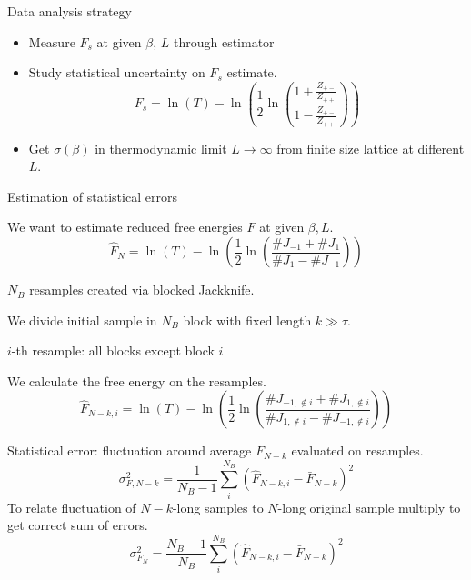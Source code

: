 \documentclass[12pt,handout]{beamer}
\begin{document}
\begin{frame}{Data analysis strategy}
\begin{center}
\begin{itemize}
\item Measure $F_s$ at given $\beta$, $L$ through estimator
\item Study statistical uncertainty on $F_s$ estimate.
\[
	F_s = \ln \left( T \right) - \ln \left( \frac{1}{2} \ln \left( \frac{1 + \frac{Z_{+-}}{Z_{++}}}{1 - \frac{Z_{+-}}{Z_{++}}} \right) \right)
\]
\vspace{10pt}
\item Get $\sigma\left(\beta\right)$ in thermodynamic limit $L\rightarrow \infty$ from finite size lattice at different $L$.
\end{itemize}
\vspace{10pt}
\end{center}
\end{frame}

\begin{frame}{Estimation of statistical errors}
\begin{center}
We want to estimate reduced free energies $F$ at given $\beta, L$.
\[
	\hat{F}_N = \ln \left( T \right) - \ln \left( \frac{1}{2} \ln \left( \frac{\# J_{-1} + \# J_1}{\# J_1 - \# J_{-1}} \right) \right)
\]

$N_B$ resamples created via blocked Jackknife.

We divide initial sample in $N_B$ block with fixed length $k\gg \tau$.

$i$-th resample: all blocks except block $i$

We calculate the free energy on the resamples.
\[
	\hat{F}_{N-k, i}  = \ln \left( T \right) - \ln \left( \frac{1}{2} \ln \left( \frac{\# J_{-1, \not\in i} + \# J_{1, \not\in i}}{\# J_{1, \not\in i} - \# J_{-1, \not\in i}} \right) \right)
\]

\end{center}
\end{frame}

\begin{frame}
\begin{center}
Statistical error: fluctuation around average $\bar{F}_{N-k}$ evaluated on resamples.
\[
\sigma_{F, N-k}^2 = \frac{1}{N_B-1}\sum_i ^{N_B} \left(\hat{F}_{N-k, i} - \bar{F}_{N-k}\right)^2
\]
To relate fluctuation of $N-k$-long samples to $N$-long original sample multiply to get correct sum of errors.
\[
\sigma_{F_N}^2 = \frac{N_B-1}{N_B}\sum_i ^{N_B} \left(\hat{F}_{N-k, i} - \bar{F}_{N-k}\right)^2
\]
\end{center}
\end{frame}
\end{document}
